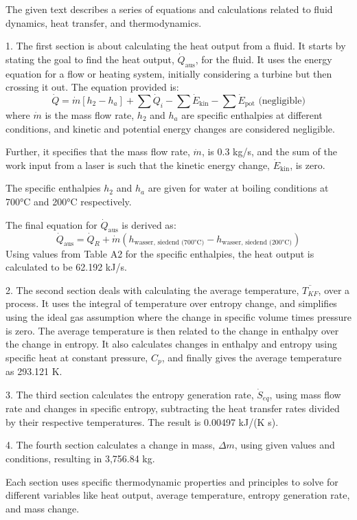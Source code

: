 The given text describes a series of equations and calculations related to fluid dynamics, heat transfer, and thermodynamics.

1. The first section is about calculating the heat output from a fluid. It starts by stating the goal to find the heat output, \(\dot{Q}_{\text{aus}}\), for the fluid. It uses the energy equation for a flow or heating system, initially considering a turbine but then crossing it out. The equation provided is:
   \[
   \dot{Q} = \dot{m} [h_2 - h_a] + \sum \dot{Q}_i - \sum \dot{E}_{\text{kin}} - \sum \dot{E}_{\text{pot}} \text{ (negligible)}
   \]
   where \(\dot{m}\) is the mass flow rate, \(h_2\) and \(h_a\) are specific enthalpies at different conditions, and kinetic and potential energy changes are considered negligible.

   Further, it specifies that the mass flow rate, \(\dot{m}\), is 0.3 kg/s, and the sum of the work input from a laser is such that the kinetic energy change, \(\dot{E}_{\text{kin}}\), is zero.

   The specific enthalpies \(h_2\) and \(h_a\) are given for water at boiling conditions at 700°C and 200°C respectively.

   The final equation for \(\dot{Q}_{\text{aus}}\) is derived as:
   \[
   \dot{Q}_{\text{aus}} = \dot{Q}_R + \dot{m} (h_{\text{wasser, siedend (700°C)}} - h_{\text{wasser, siedend (200°C)}})
   \]
   Using values from Table A2 for the specific enthalpies, the heat output is calculated to be 62.192 kJ/s.

2. The second section deals with calculating the average temperature, \(\overline{T_{KF}}\), over a process. It uses the integral of temperature over entropy change, and simplifies using the ideal gas assumption where the change in specific volume times pressure is zero. The average temperature is then related to the change in enthalpy over the change in entropy. It also calculates changes in enthalpy and entropy using specific heat at constant pressure, \(C_p\), and finally gives the average temperature as 293.121 K.

3. The third section calculates the entropy generation rate, \(\dot{S}_{eq}\), using mass flow rate and changes in specific entropy, subtracting the heat transfer rates divided by their respective temperatures. The result is 0.00497 kJ/(K s).

4. The fourth section calculates a change in mass, \(\Delta m\), using given values and conditions, resulting in 3,756.84 kg.

Each section uses specific thermodynamic properties and principles to solve for different variables like heat output, average temperature, entropy generation rate, and mass change.